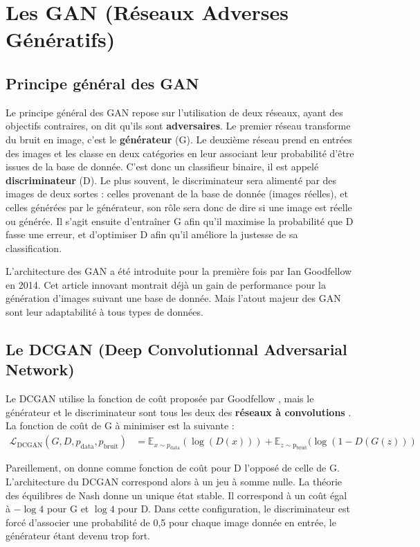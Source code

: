 
\chapter{Les GAN (Réseaux Adverses Génératifs)}

\section{Principe général des GAN}
Le principe général des GAN repose sur l'utilisation de deux réseaux, ayant des objectifs contraires, on dit qu'ils sont \textbf{adversaires}. Le premier réseau transforme du bruit en image, c'est le \textbf{générateur} (G). Le deuxième réseau prend en entrées des images et les classe en deux catégories en leur associant leur probabilité d'être issues de la base de donnée. C'est donc un classifieur binaire, il est appelé \textbf{discriminateur} (D). Le plus souvent, le discriminateur sera alimenté par des images de deux sortes : celles provenant de la base de donnée (images réelles), et celles générées par le générateur, son rôle sera donc de dire si une image est réelle ou générée. Il s'agit ensuite d'entraîner G afin qu'il maximise la probabilité que D fasse une erreur, et d'optimiser D afin qu'il améliore la justesse de sa classification.

L'architecture des GAN a été introduite pour la première fois par Ian Goodfellow \cite{goodfellow_generative_2014} en 2014. Cet article innovant montrait déjà un gain de performance pour la génération d'images suivant une base de donnée. Mais l'atout majeur des GAN sont leur adaptabilité à tous types de données.


\section{Le DCGAN (Deep Convolutionnal Adversarial Network)}
Le DCGAN utilise la fonction de coût proposée par Goodfellow \cite{goodfellow_generative_2014}, mais le générateur et le discriminateur sont tous les deux des \textbf{réseaux à convolutions} \cite{radford_unsupervised_2015-1}. La fonction de coût de G à minimiser est la suivante : $$\begin{aligned}
\mathcal{L}_{\mathrm{DCGAN}}\left(G, D, p_{\mathrm{data}}, p_{\mathrm{bruit}}\right) &=
   \mathbb{E}_{x \sim p_{\mathrm{data}}}(\log (D(x))) + \mathbb{E}_{z \sim \mathrm{p_{bruit}}}(\log (1 - D(G(z)))
\end{aligned}$$

Pareillement, on donne comme fonction de coût pour D l'opposé de celle de G. L'architecture du DCGAN correspond alors à un jeu à somme nulle. La théorie des équilibres de Nash donne un unique état stable. Il correspond à un coût égal à $-\log 4$ pour G et $ \log 4$ pour D. Dans cette configuration, le discriminateur est forcé d'associer une probabilité de 0,5 pour chaque image donnée en entrée, le générateur étant devenu trop fort.

